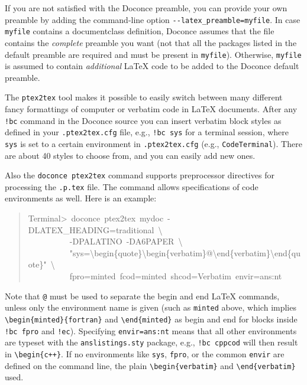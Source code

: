 \documentclass[a4paper]{article}
\begin{document}
If you are not satisfied with the Doconce preamble, you can provide
your own preamble by adding the command-line option \texttt{-{}-latex\_preamble=myfile}.
In case \texttt{myfile} contains a documentclass definition, Doconce assumes
that the file contains the \emph{complete} preamble you want (not that all
the packages listed in the default preamble are required and must be
present in \texttt{myfile}). Otherwise, \texttt{myfile} is assumed to contain
\emph{additional} LaTeX code to be added to the Doconce default preamble.

The \texttt{ptex2tex} tool makes it possible to easily switch between many
different fancy formattings of computer or verbatim code in LaTeX
documents. After any \texttt{!bc} command in the Doconce source you can
insert verbatim block styles as defined in your \texttt{.ptex2tex.cfg}
file, e.g., \texttt{!bc sys} for a terminal session, where \texttt{sys} is set to
a certain environment in \texttt{.ptex2tex.cfg} (e.g., \texttt{CodeTerminal}).
There are about 40 styles to choose from, and you can easily add
new ones.

Also the \texttt{doconce ptex2tex} command supports preprocessor directives
for processing the \texttt{.p.tex} file. The command allows specifications
of code environments as well. Here is an example:
%
\begin{quote}{\ttfamily \raggedright \noindent
Terminal>~doconce~ptex2tex~mydoc~-DLATEX\_HEADING=traditional~\textbackslash{}\\
~~~~~~~~~~-DPALATINO~-DA6PAPER~\textbackslash{}\\
~~~~~~~~~~"sys=\textbackslash{}begin\{quote\}\textbackslash{}begin\{verbatim\}@\textbackslash{}end\{verbatim\}\textbackslash{}end\{quote\}"~\textbackslash{}\\
~~~~~~~~~~fpro=minted~fcod=minted~shcod=Verbatim~envir=ans:nt
}
\end{quote}

Note that \texttt{@} must be used to separate the begin and end LaTeX
commands, unless only the environment name is given (such as \texttt{minted}
above, which implies \texttt{\textbackslash{}begin\{minted\}\{fortran\}} and \texttt{\textbackslash{}end\{minted\}} as
begin and end for blocks inside \texttt{!bc fpro} and \texttt{!ec}).  Specifying
\texttt{envir=ans:nt} means that all other environments are typeset with the
\texttt{anslistings.sty} package, e.g., \texttt{!bc cppcod} will then result in
\texttt{\textbackslash{}begin\{c++\}}. If no environments like \texttt{sys}, \texttt{fpro}, or the common
\texttt{envir} are defined on the command line, the plain \texttt{\textbackslash{}begin\{verbatim\}}
and \texttt{\textbackslash{}end\{verbatim\}} used.
\end{document}
